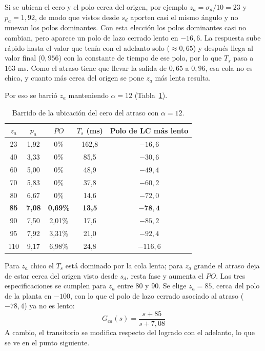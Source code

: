 \documentclass[11pt,a4paper]{article}
\begin{document}
Si se ubican el cero y el polo cerca del origen, por ejemplo $z_a = \sigma_d/10 = 23$ y $p_a = 1{,}92$, de modo que vistos desde $s_d$ aporten casi el mismo ángulo y no muevan los polos dominantes. Con esta elección los polos dominantes casi no cambian, pero aparece un polo de lazo cerrado lento en $-16{,}6$. La respuesta sube rápido hasta el valor que tenía con el adelanto solo ($\approx 0{,}65$) y después llega al valor final ($0{,}956$) con la constante de tiempo de ese polo, por lo que $T_s$ pasa a $163$ ms. Como el atraso tiene que llevar la salida de $0{,}65$ a $0{,}96$, esa cola no es chica, y cuanto más cerca del origen se pone $z_a$ más lenta resulta.

Por eso se barrió $z_a$ manteniendo $\alpha = 12$ (Tabla~\ref{tab:barrido}).

\begin{table}[H]
    \centering
    \caption{Barrido de la ubicación del cero del atraso con $\alpha = 12$.}
    \vspace{2mm}
    \begin{tabular}{ccccc}
        \toprule
        $z_a$ & $p_a$ & $PO$ & $T_s$ (ms) & Polo de LC más lento \\
        \midrule
        23 & 1,92 & 0\% & 162,8 & $-16{,}6$ \\
        40 & 3,33 & 0\% & 85,5 & $-30{,}6$ \\
        60 & 5,00 & 0\% & 48,9 & $-49{,}4$ \\
        70 & 5,83 & 0\% & 37,8 & $-60{,}2$ \\
        80 & 6,67 & 0\% & 14,6 & $-72{,}0$ \\
        \textbf{85} & \textbf{7,08} & \textbf{0,69\%} & \textbf{13,5} & $\mathbf{-78{,}4}$ \\
        90 & 7,50 & 2,01\% & 17,6 & $-85{,}2$ \\
        95 & 7,92 & 3,31\% & 21,0 & $-92{,}4$ \\
        110 & 9,17 & 6,98\% & 24,8 & $-116{,}6$ \\
        \bottomrule
    \end{tabular}
    \label{tab:barrido}
\end{table}

Para $z_a$ chico el $T_s$ está dominado por la cola lenta; para $z_a$ grande el atraso deja de estar cerca del origen visto desde $s_d$, resta fase y aumenta el $PO$. Las tres especificaciones se cumplen para $z_a$ entre 80 y 90. Se elige $z_a = 85$, cerca del polo de la planta en $-100$, con lo que el polo de lazo cerrado asociado al atraso ($-78{,}4$) ya no es lento:
\begin{equation}
    G_{ca}(s) = \frac{s + 85}{s + 7{,}08}
\end{equation}
A cambio, el transitorio se modifica respecto del logrado con el adelanto, lo que se ve en el punto siguiente.
\end{document}
